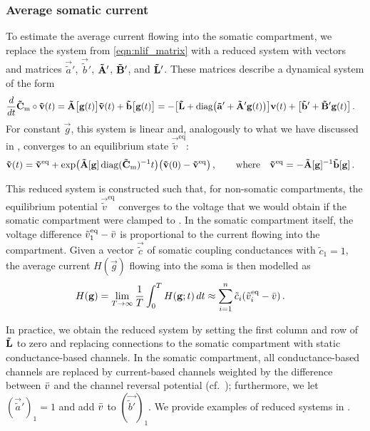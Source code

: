 \subsubsection{Average somatic current}
To estimate the average current flowing into the somatic compartment, we replace the system from \cref{eqn:nlif_matrix} with a reduced system with vectors and matrices $\vec{\tilde a}'$, $\vec{\tilde b}'$, $\mathbf{\tilde A}'$, $\mathbf{\tilde B}'$, and $\mathbf{\tilde L}'$.
These matrices describe a dynamical system of the form%
\begin{align}
	\frac{d}{dt} \mathbf{\tilde C}_\mathrm{m} \circ \mathbf{\tilde v}(t)
	&= \mathbf{\tilde A}\big[\mathbf{g}(t)\big] \mathbf{\tilde v}(t) + \mathbf{\tilde b}\big[\mathbf{g}(t)\big]
	 = -\big[\mathbf{\tilde L} + \mathrm{diag}\big(\mathbf{\tilde a'} + \mathbf{\tilde A'} \mathbf{g}(t)\big)\big] \mathbf{v}(t) + \big[\mathbf{\tilde b}' + \mathbf{\tilde B}' \mathbf{g}(t)\big] \,.
	\label{eqn:nlif_matrix_reduced}
\end{align}
For constant $\vec g$, this system is linear and, analogously to what we have discussed in , converges to an equilibrium state $\vec {\tilde v}^\mathrm{eq}$:
\begin{align}
	\mathbf{\tilde v}(t)
	=
	  \mathbf{\tilde v}^\mathrm{eq}
	+ \exp\bigl(
		\mathbf{\tilde A}[\mathbf{g}] \operatorname{\mathrm{diag}}(\mathbf{\tilde C}_\mathrm{m})^{-1} t
	  \bigr) \bigl(
	    \mathbf{\tilde v}(0) - \mathbf{\tilde v}^\mathrm{eq}
	  \bigr) \,,
	\quad\quad \text{where} \quad \mathbf{\tilde v}^\mathrm{eq} &= -{\mathbf{\tilde A}}[\mathbf{g}]^{-1} \mathbf{\tilde b}[\mathbf{g}] \,.
	\label{eqn:nlif_eq}
\end{align}

This reduced system is constructed such that, for non-somatic compartments, the equilibrium potential $\vec{\tilde v}^\mathrm{eq}$ converges to the voltage that we would obtain if the somatic compartment were clamped to \vSom.
In the somatic compartment itself, the voltage difference $\tilde v^\mathrm{eq}_1 - {{\bar v}}$ is proportional to the current flowing into the compartment.
Given a vector $\vec{\tilde c}$ of somatic coupling conductances with $\tilde c_1 = 1$, the average current $H(\vec g)$ flowing into the soma is then modelled as
\begin{align}
	H(\mathbf{g}) &= \lim_{T \to \infty} \frac{1}T \int_{0}^T H(\mathbf{g}; t) \,dt \approx \sum_{i = 1}^n \tilde c_i (\tilde v^\mathrm{eq}_i - {{\bar v}}) \,.
	\label{eqn:h_model}
\end{align}

In practice, we obtain the reduced system by setting the first column and row of $\mathbf{\tilde L}$ to zero and replacing connections to the somatic compartment with static conductance-based channels.
In the somatic compartment, all conductance-based channels are replaced by current-based channels weighted by the difference between ${{\bar v}}$ and the channel reversal potential (cf.~\cite{stockel2017point}); furthermore, we let $(\vec {\tilde a}')_1 = 1$ and add ${{\bar v}}$ to $(\vec {\tilde b'})_1$.
We provide examples of reduced systems in .

